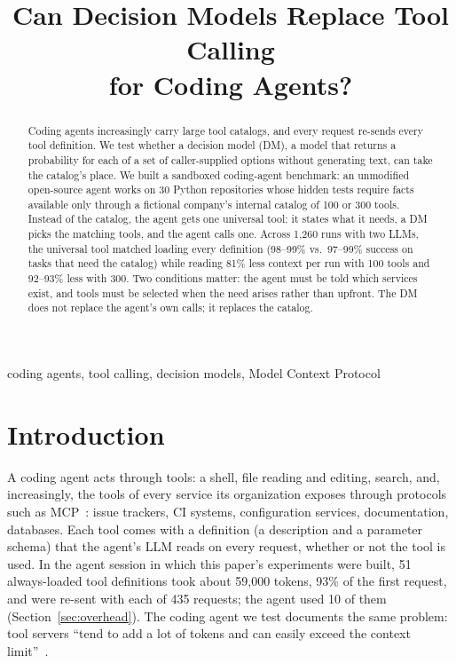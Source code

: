 \documentclass[conference]{IEEEtran}
\newif\ifanon
\begin{document}
\title{Can Decision Models Replace Tool Calling\\for Coding Agents?}

\ifanon
\author{\IEEEauthorblockN{Anonymous Author(s)}}
\else
\author{
\and
{}}
\fi

\maketitle

\begin{abstract}
Coding agents increasingly carry large tool catalogs, and every request re-sends every tool definition. We
test whether a decision model (DM), a model that returns a probability for each of a set of caller-supplied
options without generating text, can take the catalog's place. We built a sandboxed coding-agent benchmark:
an unmodified open-source agent works on 30 Python repositories whose hidden tests require facts available
only through a fictional company's internal catalog of 100 or 300 tools. Instead of the catalog, the agent
gets one universal tool: it states what it needs, a DM picks the matching tools, and the agent calls one.
Across 1,260 runs with two LLMs, the universal tool matched loading every definition (98--99\% vs.\
97--99\% success on tasks that need the catalog) while reading 81\% less context per run with 100 tools and
92--93\% less with 300. Two conditions matter: the agent must be told which services exist, and tools must
be selected when the need arises rather than upfront. The DM does not replace the agent's own calls; it
replaces the catalog.
\end{abstract}

\begin{IEEEkeywords}
coding agents, tool calling, decision models, Model Context Protocol
\end{IEEEkeywords}

\section{Introduction}\label{sec:intro}
A coding agent acts through tools: a shell, file reading and editing, search, and, increasingly, the tools of
every service its organization exposes through protocols such as MCP~\cite{mcp}: issue trackers, CI systems,
configuration services, documentation, databases. Each tool comes with a definition (a description and a
parameter schema) that the agent's LLM reads on every request, whether or not the tool is used. In the agent
session in which this paper's experiments were built, 51 always-loaded tool definitions took about 59,000
tokens, 93\% of the first request, and were re-sent with each of 435 requests; the agent used 10 of them
(Section~\ref{sec:overhead}). The coding agent we test documents the same problem: tool servers ``tend to add
a lot of tokens and can easily exceed the context limit''~\cite{opencode}.
\end{document}
